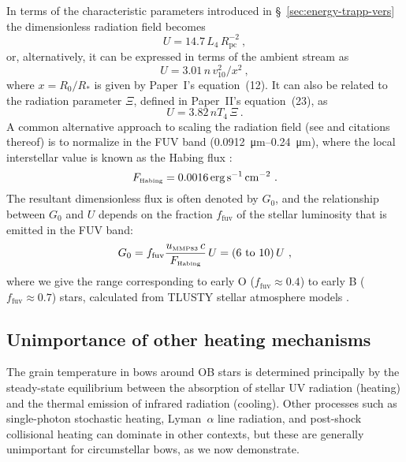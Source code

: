 \documentclass[useAMS, usenatbib, a4paper]{mnras}
\newcommand\mmp{\ensuremath{_{\text{\tiny MMP83}}}}
\newcommand\Hab{\ensuremath{_{\text{\tiny Habing}}}}
\begin{document}
In terms of the characteristic parameters introduced in
\S~\ref{sec:energy-trapp-vers} the dimensionless radiation field
becomes
\begin{equation}
  \label{eq:U-from-L4-and-Rpc}
  U = 14.7\, L_4\, R_{\text{pc}}^{-2} \ ,
\end{equation}
or, alternatively, it can be expressed in terms of the ambient stream as
\begin{equation}
  \label{eq:U-from-ambient}
  U = 3.01 \, n \, v_{10}^2 / x^2 \ , 
\end{equation}
where \(x = R_0/R_*\) is given by Paper~I's equation~(12).
It can also be related to the radiation parameter \(\Xi\), defined in
Paper~II's equation~(23), as
\begin{equation}
  \label{eq:U-vs-Xi}
  U = 3.82 \, n T_4 \, \Xi \ .
\end{equation}
A common alternative approach to scaling the radiation field (see
\citealp{Tielens:1985a} and citations thereof) is to normalize in the
FUV band (\SIrange{0.0912}{0.24}{\um}), where the local interstellar
value is known as the Habing flux \citep{Habing:1968a}:
\begin{equation}
  \label{eq:Habing-flux}
  F\Hab = \SI{0.0016}{erg.s^{-1}.cm^{-2}} \ .
\end{equation}
The resultant dimensionless flux is often denoted by \(G_0\), and the
relationship between \(G_0\) and \(U\) depends on the fraction
\(f_{\text{fuv}}\) of the stellar luminosity that is emitted in the
FUV band:
\begin{equation}
  \label{eq:G-vs-U}
  G_0 = f_{\text{fuv}} \frac{u\mmp\, c}{F\Hab} \,U = (\text{\numrange{6}{10}}) \,U \ ,
\end{equation}
where we give the range corresponding to early O
(\(f_{\text{fuv}} \approx 0.4\)) to early B
(\(f_{\text{fuv}} \approx 0.7\)) stars, calculated from TLUSTY stellar
atmosphere models \citep{Lanz:2003a, Lanz:2007a}.


\subsection{Unimportance of other heating mechanisms}
\label{sec:unimp-other-heat}
The grain temperature in bows around OB stars is determined
principally by the steady-state equilibrium between the absorption of
stellar UV radiation (heating) and the thermal emission of infrared
radiation (cooling).  Other processes such as single-photon stochastic
heating, Lyman~\(\alpha\) line radiation, and post-shock collisional
heating can dominate in other contexts, but these are generally
unimportant for circumstellar bows, as we now demonstrate.
\end{document}
